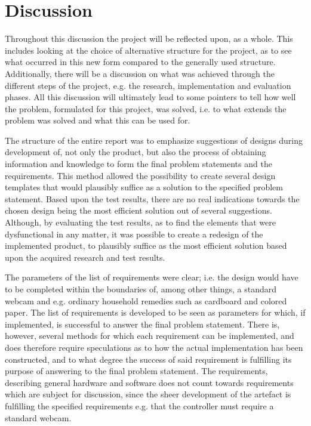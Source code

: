 \section{Discussion}
Throughout this discussion the project will be reflected upon, as a whole. This includes looking at the choice of alternative structure for the project, as to see what occurred in this new form compared to the generally used structure. Additionally, there will be a discussion on what was achieved through the different steps of the project, e.g. the research, implementation and evaluation phases. All this discussion will ultimately lead to some pointers to tell how well the problem, formulated for this project, was solved, i.e. to what extends the problem was solved and what this can be used for.
\bigskip

The structure of the entire report was to emphasize suggestions of designs during development of, not only the product, but also the process of obtaining information and knowledge to form the final problem statements and the requirements. This method allowed the possibility to create several design templates that would plausibly suffice as a solution to the specified problem statement. Based upon the test results, there are no real indications towards the chosen design being the most efficient solution out of several suggestions. Although, by evaluating the test results, as to find the elements that were dysfunctional in any matter, it was possible to create a redesign of the implemented product, to plausibly suffice as the most efficient solution based upon the acquired research and test results.
\bigskip

The parameters of the list of requirements were clear; i.e. the design would have to be completed within the boundaries of, among other things, a standard webcam and e.g. ordinary household remedies such as cardboard and colored paper. The list of requirements is developed to be seen as parameters for which, if implemented, is successful to answer the final problem statement. There is, however, several methods for which each requirement can be implemented, and does therefore require speculations as to how the actual implementation has been constructed, and to what degree the success of said requirement is fulfilling its purpose of answering to the final problem statement. The requirements, describing general hardware and software does not count towards requirements which are subject for discussion, since the sheer development of the artefact is fulfilling the specified requirements e.g. that the controller must require a standard webcam.
\bigskip

